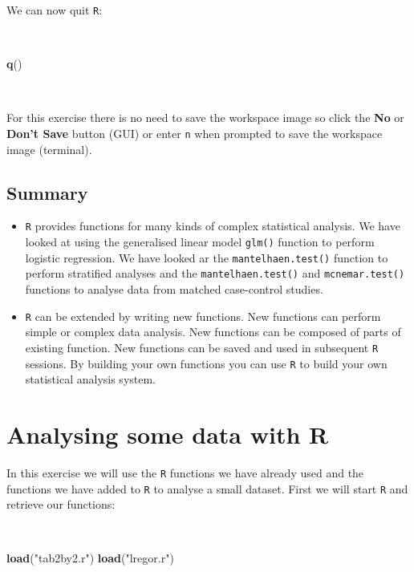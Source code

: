 \documentclass[12pt,a4paper]{book}
\newenvironment{Shaded}{\begin{snugshade}}{\end{snugshade}}
\newcommand{\KeywordTok}[1]{\textcolor[rgb]{0.13,0.29,0.53}{\textbf{#1}}}
\newcommand{\StringTok}[1]{\textcolor[rgb]{0.31,0.60,0.02}{#1}}
\newcommand{\NormalTok}[1]{#1}
\theoremstyle{definition}
\theoremstyle{definition}
\theoremstyle{definition}
\theoremstyle{remark}
\begin{document}
We can now quit \texttt{R}:

~

\begin{Shaded}
\begin{Highlighting}[]
\KeywordTok{q}\NormalTok{()}
\end{Highlighting}
\end{Shaded}

~

For this exercise there is no need to save the workspace image so click
the \textbf{No} or \textbf{Don't Save} button (GUI) or enter \texttt{n}
when prompted to save the workspace image (terminal).

\hypertarget{summary-2}{%
\section{Summary}\label{summary-2}}

\begin{itemize}
\item
  \texttt{R} provides functions for many kinds of complex statistical
  analysis. We have looked at using the generalised linear model
  \texttt{glm()} function to perform logistic regression. We have looked
  ar the \texttt{mantelhaen.test()} function to perform stratified
  analyses and the \texttt{mantelhaen.test()} and
  \texttt{mcnemar.test()} functions to analyse data from matched
  case-control studies.
\item
  \texttt{R} can be extended by writing new functions. New functions can
  perform simple or complex data analysis. New functions can be composed
  of parts of existing function. New functions can be saved and used in
  subsequent \texttt{R} sessions. By building your own functions you can
  use \texttt{R} to build your own statistical analysis system.
\end{itemize}

\hypertarget{exercise4}{%
\chapter{Analysing some data with R}\label{exercise4}}

In this exercise we will use the \texttt{R} functions we have already
used and the functions we have added to \texttt{R} to analyse a small
dataset. First we will start \texttt{R} and retrieve our functions:

~

\begin{Shaded}
\begin{Highlighting}[]
\KeywordTok{load}\NormalTok{(}\StringTok{"tab2by2.r"}\NormalTok{)}
\KeywordTok{load}\NormalTok{(}\StringTok{"lregor.r"}\NormalTok{)}
\end{Highlighting}
\end{Shaded}
\end{document}
